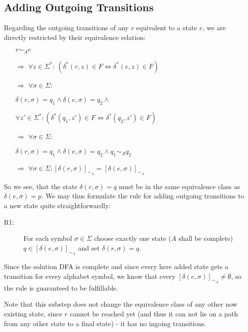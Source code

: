 \subsection{Adding Outgoing Transitions}

Regarding the outgoing transitions of any $r$ equivalent to a state $e$, we are directly restricted by their equivalence relation:
\begin{itemize}
	\item[] $r \sim_A e$
	\item[$\Rightarrow$] $\forall z \in \Sigma^* \colon\ (\delta^*(r, z) \in F \Leftrightarrow \delta^*(e, z) \in F)$
	
	\item[$\Rightarrow$] $\forall \sigma \in \Sigma \colon$
	
	\qquad $\delta(r, \sigma) = q_1 \land \delta(e, \sigma) = q_2 \land$
	
	\qquad $\forall z' \in \Sigma^*\colon (\delta^*(q_1, z') \in F \Leftrightarrow \delta^*(q_2, z') \in F)$
	
	\item[$\Rightarrow$] $\forall \sigma \in \Sigma \colon$
	
	\qquad $\delta(r, \sigma) = q_1 \land \delta(e, \sigma) = q_2 \land q_1 \sim_A q_2$
	
	\item[$\Rightarrow$] $\forall \sigma \in \Sigma \colon [\delta(r, \sigma)]_{\sim_A} = [\delta(e, \sigma)]_{\sim_A}$
\end{itemize}
So we see, that the state $\delta(r, \sigma) = q$ must be in the same equivalence class as $\delta(e, \sigma) = p$. We may thus formulate the rule for adding outgoing transitions to a new state quite straightforwardly:
\begin{description}
	\item[R1:] For each symbol $\sigma \in \Sigma$ choose exactly one state ($A$ shall be complete) $q\in[\delta(e, \sigma)]_{\sim_A}$ and set $\delta(r, \sigma) = q$.
\end{description}
Since the solution DFA is complete and since every here added state gets a transition for every alphabet symbol, we know that every $[\delta(e, \sigma)]_{\sim_A} \neq \emptyset$, so the rule is guaranteed to be fulfillable.

Note that this substep does not change the equivalence class of any other now existing state, since $r$ cannot be reached yet (and thus it can not lie on a path from any other state to a final state) - it has no ingoing transitions.

